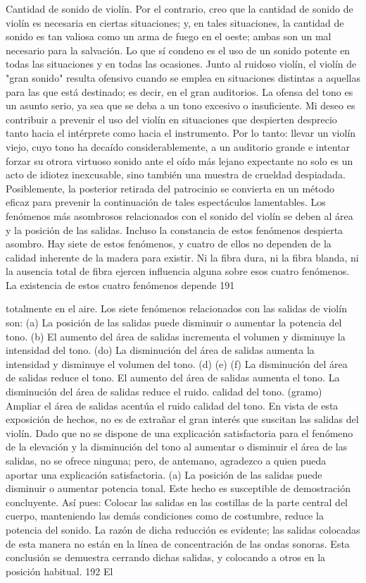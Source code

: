 Cantidad de sonido de violín. Por el contrario, creo que la cantidad de sonido de violín es necesaria en ciertas situaciones; y, en tales situaciones, la cantidad de sonido es tan valiosa como un arma de fuego en el oeste; ambas son un mal necesario para la salvación. Lo que sí condeno es el uso de un sonido potente en todas las situaciones y en todas las ocasiones.
Junto al ruidoso violín, el violín de "gran sonido" resulta ofensivo cuando se emplea en situaciones distintas a aquellas para las que está destinado; es decir, en el gran
auditorios. La ofensa del tono es un asunto serio, ya sea que se deba a un tono excesivo o insuficiente. Mi deseo es contribuir a prevenir el uso del violín en situaciones que despierten desprecio tanto hacia el intérprete como hacia el instrumento. Por lo tanto: llevar un violín viejo, cuyo tono ha decaído considerablemente, a un auditorio grande e intentar forzar su otrora virtuoso sonido ante el oído más lejano expectante no solo es un acto de idiotez inexcusable, sino también una muestra de crueldad despiadada. Posiblemente, la posterior retirada del patrocinio se convierta en un método eficaz para prevenir la continuación de tales espectáculos lamentables.
Los fenómenos más asombrosos relacionados con el sonido del violín se deben al área y la posición de las salidas. Incluso la constancia de estos fenómenos despierta asombro. Hay siete de estos fenómenos, y cuatro de ellos no dependen de la calidad inherente de la madera para existir. Ni la fibra dura, ni la fibra blanda, ni la ausencia total de fibra ejercen influencia alguna sobre esos cuatro fenómenos. La existencia de estos cuatro fenómenos depende
191

totalmente en el aire.
Los siete fenómenos relacionados con las salidas de violín son:
(a) La posición de las salidas puede disminuir o aumentar la potencia del tono.
(b) El aumento del área de salidas incrementa el volumen y disminuye la intensidad del tono.
(do)	La disminución del área de salidas aumenta la intensidad
y disminuye el volumen del tono.	
(d) (e) (f)	La disminución del área de salidas reduce el tono. El aumento del área de salidas aumenta el tono. La disminución del área de salidas reduce el ruido.
calidad del tono.	
(gramo)	Ampliar el área de salidas acentúa el ruido
calidad del tono.
En vista de esta exposición de hechos, no es de extrañar el gran interés que suscitan las salidas del violín. Dado que no se dispone de una explicación satisfactoria para el fenómeno de la elevación y la disminución del tono al aumentar o disminuir el área de las salidas, no se ofrece ninguna; pero, de antemano, agradezco a quien pueda aportar una explicación satisfactoria. (a) La posición de las salidas puede disminuir o aumentar
potencia tonal.
Este hecho es susceptible de demostración concluyente. Así pues: Colocar las salidas en las costillas de la parte central del cuerpo, manteniendo las demás condiciones como de costumbre, reduce la potencia del sonido. La razón de dicha reducción es evidente; las salidas colocadas de esta manera no están en la línea de concentración de las ondas sonoras. Esta conclusión se demuestra cerrando dichas salidas,
y colocando a otros en la posición habitual. 192	El

